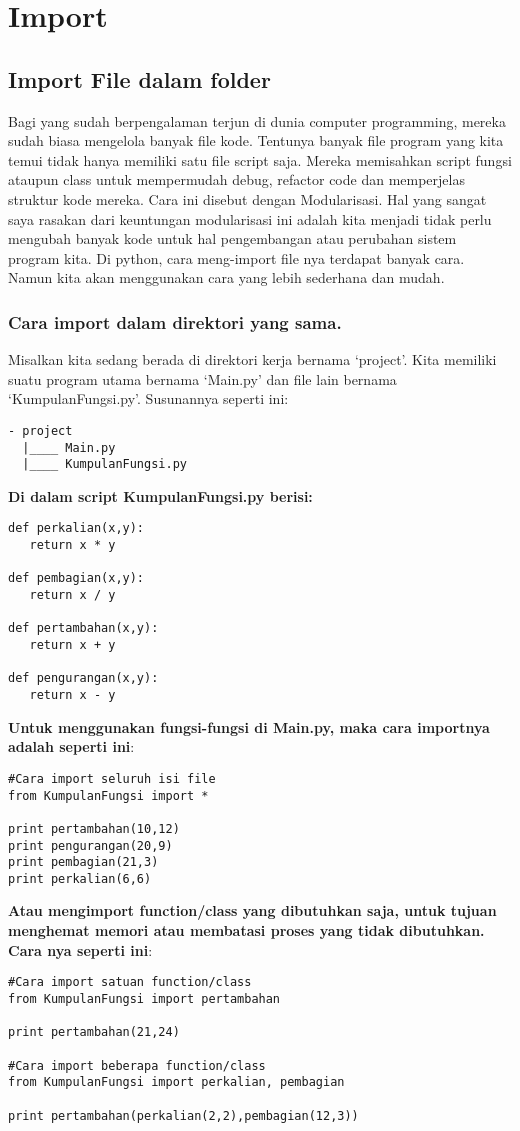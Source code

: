 \chapter{Import}
\section{Import File dalam folder}
\par Bagi yang sudah berpengalaman terjun di dunia computer programming, mereka sudah biasa mengelola banyak file kode. Tentunya banyak file program yang kita temui tidak hanya memiliki satu file script saja. Mereka memisahkan script fungsi ataupun class untuk mempermudah debug, refactor code dan memperjelas struktur kode mereka. Cara ini disebut dengan Modularisasi. Hal yang sangat saya rasakan dari keuntungan modularisasi ini adalah kita menjadi tidak perlu mengubah banyak kode untuk hal pengembangan atau perubahan sistem program kita. Di python, cara meng-import file nya terdapat banyak cara. Namun kita akan menggunakan cara yang lebih sederhana dan mudah.
\subsection{Cara import dalam direktori yang sama.}
Misalkan kita sedang berada di direktori kerja bernama ‘project’. Kita memiliki suatu program utama bernama ‘Main.py’ dan file lain bernama ‘KumpulanFungsi.py’. Susunannya seperti ini:
\begin{lstlisting}
- project
  |____ Main.py
  |____ KumpulanFungsi.py
\end{lstlisting}
\par \textbf{Di dalam script KumpulanFungsi.py berisi:}
\begin{lstlisting}
def perkalian(x,y):
   return x * y

def pembagian(x,y):
   return x / y

def pertambahan(x,y):
   return x + y

def pengurangan(x,y):
   return x - y
\end{lstlisting}
\par\textbf{Untuk menggunakan fungsi-fungsi di Main.py, maka cara importnya adalah seperti ini}:
\begin{lstlisting}
#Cara import seluruh isi file
from KumpulanFungsi import *

print pertambahan(10,12)
print pengurangan(20,9)
print pembagian(21,3)
print perkalian(6,6)
\end{lstlisting}
\par \textbf{Atau mengimport function/class yang dibutuhkan saja, untuk tujuan menghemat memori atau membatasi proses yang tidak dibutuhkan. Cara nya seperti ini}:
\begin{lstlisting}
#Cara import satuan function/class
from KumpulanFungsi import pertambahan

print pertambahan(21,24)

#Cara import beberapa function/class
from KumpulanFungsi import perkalian, pembagian

print pertambahan(perkalian(2,2),pembagian(12,3))
\end{lstlisting}
